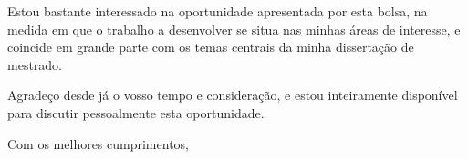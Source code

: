 \documentclass{letter} %
\begin{document}
\begin{letter}{}


\noindent Estou bastante interessado na oportunidade apresentada 
por esta bolsa, na medida em que o trabalho a desenvolver se situa
nas minhas áreas de interesse, e coincide em grande parte com os 
temas centrais da minha dissertação de mestrado.
 

\noindent Agradeço desde já o vosso tempo e consideração, e estou
inteiramente disponível para discutir pessoalmente esta oportunidade.
 
\closing{Com os melhores cumprimentos,} 
 

 

\end{letter}
 
\end{document}
